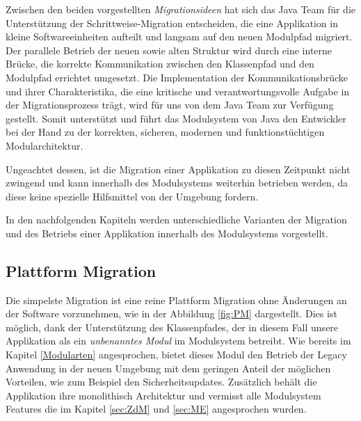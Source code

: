 	Zwischen den beiden vorgestellten \textit{Migrationsideen} hat sich das Java Team für die Unterstützung der Schrittweise-Migration entscheiden, die eine Applikation in kleine Softwareeinheiten aufteilt und langsam auf den neuen Modulpfad migriert. Der parallele Betrieb der neuen sowie alten Struktur wird durch eine interne Brücke, die korrekte Kommunikation zwischen den Klassenpfad und den Modulpfad errichtet umgesetzt. Die Implementation der Kommunikationsbrücke und ihrer Charakteristika, die eine kritische und verantwortungsvolle Aufgabe in der Migrationsprozess trägt, wird für uns von dem Java Team zur Verfügung gestellt. Somit unterstützt und führt das Modulsystem von Java den Entwickler bei der Hand zu der korrekten, sicheren, modernen und funktionstüchtigen Modularchitektur. \newline

	Ungeachtet dessen, ist die Migration einer Applikation zu diesen Zeitpunkt nicht zwingend und kann innerhalb des Modulsystems weiterhin betrieben werden, da diese keine spezielle Hilfsmittel von der Umgebung fordern.\bigbreak

	In den nachfolgenden Kapiteln werden unterschiedliche Varianten der Migration und des Betriebs einer Applikation innerhalb des Modulsystems vorgestellt. 


\subsection{Plattform Migration}

	Die simpelste Migration ist eine reine Plattform Migration ohne Änderungen an der Software vorzunehmen, wie in der Abbildung \ref{fig:PM} dargestellt. Dies ist möglich, dank der Unterstützung des Klassenpfades, der in diesem Fall unsere Applikation als ein \textit{unbenanntes Modul} im Modulsystem betreibt. Wie bereits im Kapitel \ref{Modularten} angesprochen, bietet dieses Modul den Betrieb der Legacy Anwendung in der neuen Umgebung mit dem geringen Anteil der möglichen Vorteilen, wie zum Beispiel den Sicherheitsupdates. Zusätzlich behält die Applikation ihre monolithisch Architektur und vermisst alle Modulsystem Features die im Kapitel \ref{sec:ZdM} und \ref{sec:ME} angesprochen wurden.

